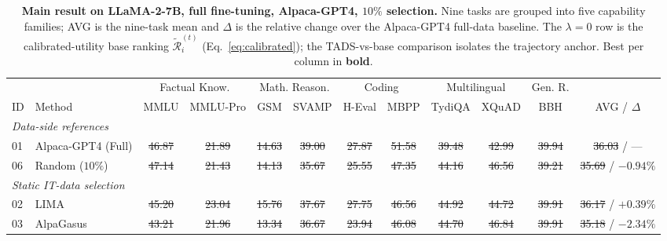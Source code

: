 \begin{table}[t]
\centering
\caption{\textbf{Main result on LLaMA-2-7B, full fine-tuning,
Alpaca-GPT4, $10\%$ selection.} Nine tasks are grouped into five
capability families; AVG is the nine-task mean and $\Delta$ is the
relative change over the Alpaca-GPT4 full-data baseline. The
$\lambda=0$ row is the calibrated-utility base ranking
$\tilde{\mathcal{R}}_i^{(t)}$ (Eq.~\ref{eq:calibrated}); the
\textsc{TADS}-vs-base comparison isolates the trajectory anchor.
Best per column in \textbf{bold}. }
\label{tab:main}
\small
\setlength{\tabcolsep}{4pt}
\begin{tabular}{llcccccccccc}
\toprule
 & & \multicolumn{2}{c}{Factual Know.}
   & \multicolumn{2}{c}{Math. Reason.}
   & \multicolumn{2}{c}{Coding}
   & \multicolumn{2}{c}{Multilingual}
   & Gen. R. & \\
\cmidrule(lr){3-4}\cmidrule(lr){5-6}\cmidrule(lr){7-8}\cmidrule(lr){9-10}\cmidrule(lr){11-11}
ID & Method & MMLU & MMLU-Pro & GSM & SVAMP & H-Eval & MBPP
   & TydiQA & XQuAD & BBH & AVG / $\Delta$ \\
\midrule
\multicolumn{12}{l}{\textit{Data-side references}}\\
01 & Alpaca-GPT4 (Full)
& \sout{46.87} & \sout{21.89} & \sout{14.63} & \sout{39.00}
& \sout{27.87} & \sout{51.58} & \sout{39.48} & \sout{42.99}
& \sout{39.94} & \sout{36.03} / --- \\

06 & Random ($10\%$)
& \sout{47.14} & \sout{21.43} & \sout{14.13} & \sout{35.67}
& \sout{25.55} & \sout{47.35} & \sout{44.16} & \sout{46.56}
& \sout{39.21} & \sout{35.69} / \sout{$-0.94\%$} \\

\midrule
\multicolumn{12}{l}{\textit{Static IT-data selection}}\\
02 & LIMA
& \sout{45.20} & \sout{23.04} & \sout{15.76} & \sout{37.67}
& \sout{27.75} & \sout{46.56} & \sout{44.92} & \sout{44.72}
& \sout{39.91} & \sout{36.17} / \sout{$+0.39\%$} \\

03 & AlpaGasus
& \sout{43.21} & \sout{21.96} & \sout{13.34} & \sout{36.67}
& \sout{23.94} & \sout{46.08} & \sout{44.70} & \sout{46.84}
& \sout{39.91} & \sout{35.18} / \sout{$-2.34\%$} \\


\end{tabular}
\end{table}
